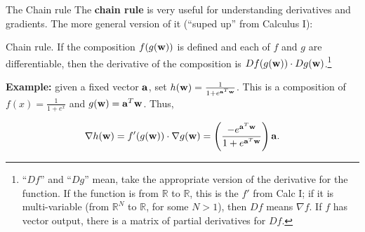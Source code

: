 \documentclass{beamer}
\theoremstyle{example}
\begin{document}
\begin{frame}{The Chain rule}
    The \textbf{chain rule} is very useful for understanding derivatives and gradients. The more general version of it (``suped up'' from Calculus I):
    \pause
    \begin{alertblock}{Chain rule.}
        If the composition $f(g({\bf w}))$ is defined and each of $f$ and $g$ are differentiable, then the derivative of the composition is $Df(g({\bf w}))\cdot Dg({\bf w})$.\footnote{``$Df$'' and ``$Dg$'' mean, take the appropriate version of the derivative for the function. If the function is from $\mathbb R$ to $\mathbb R$, this is the $f'$ from Calc I; if it is multi-variable (from $\mathbb R^N$ to $\mathbb R$, for some $N>1$), then $Df$ means $\nabla f$. If $f$ has vector output, there is a matrix of partial derivatives for $Df$.} 
    \end{alertblock}
    
    \pause
    {\bf Example:} given a fixed vector ${\bf a}$, set $h({\bf w}) = \frac{1}{1+e^{{\bf a}^T{\bf w}}}$. This is a composition of $f(x) = \frac{1}{1+e^x}$ and $g({\bf w}) = {\bf a}^T{\bf w}$. Thus, 
    
    \[\scriptsize \nabla h({\bf w}) = f'(g({\bf w}))\cdot \nabla g({\bf w}) = \left(\frac{-e^{{\bf a}^T{\bf w}}}{1 + e^{{\bf a}^T{\bf w}}}\right){\bf a}.\]
\end{frame}
\end{document}
